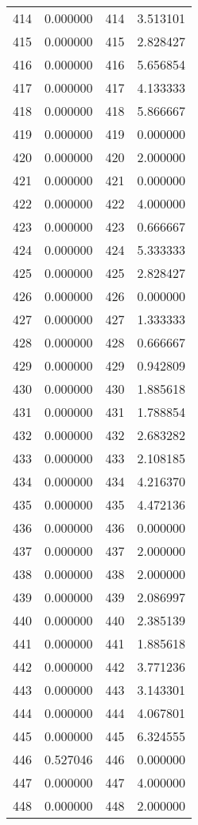 \documentclass[12pt]{article}
\begin{document}
\begin{longtable}{@{}cccc@{}}
414 & 0.000000 & 414 & 3.513101 \\
415 & 0.000000 & 415 & 2.828427 \\
416 & 0.000000 & 416 & 5.656854 \\
417 & 0.000000 & 417 & 4.133333 \\
418 & 0.000000 & 418 & 5.866667 \\
419 & 0.000000 & 419 & 0.000000 \\
420 & 0.000000 & 420 & 2.000000 \\
421 & 0.000000 & 421 & 0.000000 \\
422 & 0.000000 & 422 & 4.000000 \\
423 & 0.000000 & 423 & 0.666667 \\
424 & 0.000000 & 424 & 5.333333 \\
425 & 0.000000 & 425 & 2.828427 \\
426 & 0.000000 & 426 & 0.000000 \\
427 & 0.000000 & 427 & 1.333333 \\
428 & 0.000000 & 428 & 0.666667 \\
429 & 0.000000 & 429 & 0.942809 \\
430 & 0.000000 & 430 & 1.885618 \\
431 & 0.000000 & 431 & 1.788854 \\
432 & 0.000000 & 432 & 2.683282 \\
433 & 0.000000 & 433 & 2.108185 \\
434 & 0.000000 & 434 & 4.216370 \\
435 & 0.000000 & 435 & 4.472136 \\
436 & 0.000000 & 436 & 0.000000 \\
437 & 0.000000 & 437 & 2.000000 \\
438 & 0.000000 & 438 & 2.000000 \\
439 & 0.000000 & 439 & 2.086997 \\
440 & 0.000000 & 440 & 2.385139 \\
441 & 0.000000 & 441 & 1.885618 \\
442 & 0.000000 & 442 & 3.771236 \\
443 & 0.000000 & 443 & 3.143301 \\
444 & 0.000000 & 444 & 4.067801 \\
445 & 0.000000 & 445 & 6.324555 \\
446 & 0.527046 & 446 & 0.000000 \\
447 & 0.000000 & 447 & 4.000000 \\
448 & 0.000000 & 448 & 2.000000 \\

\end{longtable}
\end{document}
